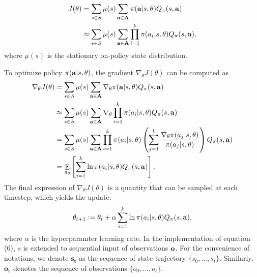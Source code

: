 \documentclass[a4paper,11pt]{article}
\DeclareMathOperator{\E}{\mathbb{E}}
\begin{document}
\begin{equation}
\begin{split}
J(\theta) & = \sum_{s \in S} \mu(s) \sum_{\bf{a} \in \bf{A}}\pi(\mathbf{a}|s,\theta)Q_\pi(s, \mathbf{a})\\
& \approx \sum_{s \in S} \mu(s) \sum_{\mathbf{a} \in \mathbf{A}}\prod^k_{i=1}\pi(a_i|s,\theta) Q_\pi(s, \mathbf{a}),
\end{split}
\end{equation}
where $\mu(s)$ is the stationary on-policy state distribution.

To optimize policy $\pi({\bf{a}}|s, \theta)$, the gradient $\nabla_\theta J(\theta)$ can be computed as 
\begin{equation}
\begin{split}
\nabla_\theta J(\theta) & = \sum_{s \in S} \mu(s) \sum_{\bf{a} \in \bf{A}} \nabla_\theta \pi(\mathbf{a}|s,\theta)Q_\pi(s, \mathbf{a})\\
& \approx \sum_{s \in S} \mu(s) \sum_{\mathbf{a} \in \mathbf{A}}\nabla_\theta \prod^k_{i=1}\pi(a_i|s,\theta) Q_\pi(s,\mathbf{a})\\
& = \sum_{s \in S} \mu(s) \sum_{\mathbf{a} \in \mathbf{A}} \prod^k_{i=1}\pi(a_i|s,\theta) \left(\sum_{j=1}^{k}\frac{\nabla_\theta \pi(a_j|s,\theta)}{\pi(a_j|s,\theta)}\right)Q_\pi(s,\mathbf{a})\\
& = \E_{\pi_\theta}\left[\sum^k_{i=1}\ln\pi(a_i|s, \theta)Q_\pi(s,\mathbf{a})\right].
\end{split}
\end{equation}
The final expression of $\nabla_\theta J(\theta)$ is a quantity that can be sampled at each timestep, which yields the update:
\begin{equation}
    \theta_{t+1} \vcentcolon= \theta_{t} +  \alpha \sum^k_{i=1}\ln\pi(a_i|s, \theta)Q_\pi(s,\mathbf{a}),
\end{equation}
where $\alpha$ is the hyperparamter learning rate. In the implementation of equation (6), $s$ is extended to sequential input of observations $\bf{o}$. For the convenience of notations, we denote $\mathbf{s_t}$ as the sequence of state trajectory $\{s_0, ..., s_t\}$. Similarly, $\mathbf{o_t}$ denotes the sequence of observations $\{o_0, ..., o_t\}$.  
\end{document}
